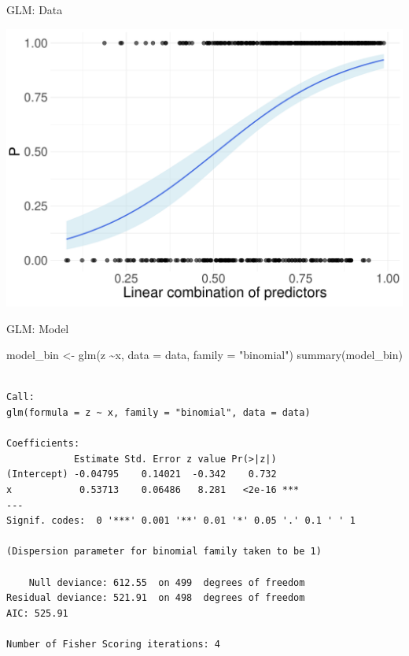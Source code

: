 \documentclass[
  ignorenonframetext,
]{beamer}
\newenvironment{Shaded}{\begin{snugshade}}{\end{snugshade}}
\newcommand{\AttributeTok}[1]{\textcolor[rgb]{0.00,0.34,0.68}{#1}}
\newcommand{\FunctionTok}[1]{\textcolor[rgb]{0.39,0.29,0.61}{#1}}
\newcommand{\NormalTok}[1]{\textcolor[rgb]{0.12,0.11,0.11}{#1}}
\newcommand{\OtherTok}[1]{\textcolor[rgb]{0.00,0.43,0.16}{#1}}
\newcommand{\SpecialCharTok}[1]{\textcolor[rgb]{0.24,0.68,0.91}{#1}}
\newcommand{\StringTok}[1]{\textcolor[rgb]{0.75,0.01,0.01}{#1}}
\begin{document}
\begin{frame}{GLM: Data}
\protect\hypertarget{glm-data}{}
\begin{center}\includegraphics[width=0.7\linewidth]{Practice_files/figure-beamer/unnamed-chunk-102-1} \end{center}
\end{frame}

\begin{frame}[fragile]{GLM: Model}
\protect\hypertarget{glm-model}{}
\scriptsize

\begin{Shaded}
\begin{Highlighting}[]
\NormalTok{model\_bin }\OtherTok{\textless{}{-}} \FunctionTok{glm}\NormalTok{(z }\SpecialCharTok{\textasciitilde{}}\NormalTok{x, }\AttributeTok{data =}\NormalTok{ data, }\AttributeTok{family =} \StringTok{"binomial"}\NormalTok{)}
\FunctionTok{summary}\NormalTok{(model\_bin)}
\end{Highlighting}
\end{Shaded}

\begin{verbatim}

Call:
glm(formula = z ~ x, family = "binomial", data = data)

Coefficients:
            Estimate Std. Error z value Pr(>|z|)    
(Intercept) -0.04795    0.14021  -0.342    0.732    
x            0.53713    0.06486   8.281   <2e-16 ***
---
Signif. codes:  0 '***' 0.001 '**' 0.01 '*' 0.05 '.' 0.1 ' ' 1

(Dispersion parameter for binomial family taken to be 1)

    Null deviance: 612.55  on 499  degrees of freedom
Residual deviance: 521.91  on 498  degrees of freedom
AIC: 525.91

Number of Fisher Scoring iterations: 4
\end{verbatim}
\end{frame}
\end{document}
